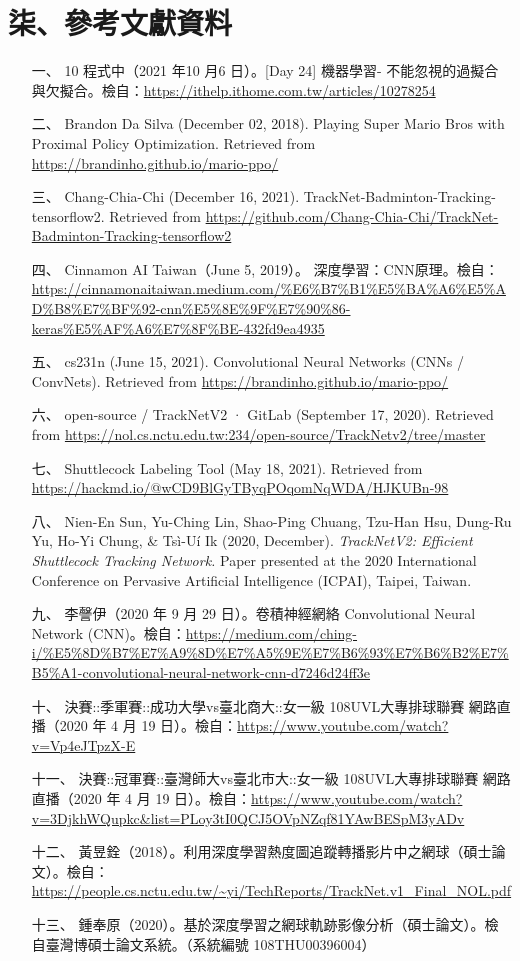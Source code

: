 \section{柒、參考文獻資料}
\begin{itemize}[itemindent = 2em]
    \item [一、] 10 程式中（2021 年10 月6 日）。[Day 24] 機器學習- 不能忽視的過擬合與欠擬合。檢自：\url{https://ithelp.ithome.com.tw/articles/10278254}
    \item [二、]Brandon Da Silva (December 02, 2018). Playing Super Mario Bros with Proximal Policy Optimization. Retrieved from \url{https://brandinho.github.io/mario-ppo/}
    \item [三、]Chang-Chia-Chi (December 16, 2021). TrackNet-Badminton-Tracking-tensorflow2. Retrieved from \url{https://github.com/Chang-Chia-Chi/TrackNet-Badminton-Tracking-tensorflow2}
    \item [四、]Cinnamon AI Taiwan（June 5, 2019）。 深度學習：CNN原理。檢自：\url{https://cinnamonaitaiwan.medium.com/%E6%B7%B1%E5%BA%A6%E5%AD%B8%E7%BF%92-cnn%E5%8E%9F%E7%90%86-keras%E5%AF%A6%E7%8F%BE-432fd9ea4935}
    \item [五、]cs231n (June 15, 2021). Convolutional Neural Networks (CNNs / ConvNets). Retrieved from \url{https://brandinho.github.io/mario-ppo/}
    \item [六、]open-source / TrackNetV2 · GitLab (September 17, 2020). Retrieved from \url{https://nol.cs.nctu.edu.tw:234/open-source/TrackNetv2/tree/master}
    \item [七、]Shuttlecock Labeling Tool (May 18, 2021). Retrieved from \url{https://hackmd.io/@wCD9BlGyTByqPOqomNqWDA/HJKUBn-98}
    \item [八、]Nien-En Sun, Yu-Ching Lin, Shao-Ping Chuang, Tzu-Han Hsu, Dung-Ru Yu, Ho-Yi Chung, \& Tsì-Uí Ik (2020, December). \textit{TrackNetV2: Efficient Shuttlecock Tracking Network.} Paper presented at the 2020 International Conference on Pervasive Artificial Intelligence (ICPAI), Taipei, Taiwan.
    \item [九、]李謦伊（2020 年 9 月 29 日）。卷積神經網絡 Convolutional Neural Network (CNN)。檢自：\url{https://medium.com/ching-i/%E5%8D%B7%E7%A9%8D%E7%A5%9E%E7%B6%93%E7%B6%B2%E7%B5%A1-convolutional-neural-network-cnn-d7246d24ff3e}
    \item [十、]決賽::季軍賽::成功大學vs臺北商大::女一級 108UVL大專排球聯賽 網路直播（2020 年 4 月 19 日）。檢自：\url{https://www.youtube.com/watch?v=Vp4eJTpzX-E}
    \item [十一、]決賽::冠軍賽::臺灣師大vs臺北市大::女一級 108UVL大專排球聯賽 網路直播（2020 年 4 月 19 日）。檢自：\url{https://www.youtube.com/watch?v=3DjkhWQupkc&list=PLoy3tI0QCJ5OVpNZqf81YAwBESpM3yADv}
    \item [十二、]黃昱銓（2018）。利用深度學習熱度圖追蹤轉播影片中之網球（碩士論文）。檢自：\url{https://people.cs.nctu.edu.tw/~yi/TechReports/TrackNet.v1_Final_NOL.pdf}
    \item [十三、]鍾奉原（2020）。基於深度學習之網球軌跡影像分析（碩士論文）。檢自臺灣博碩士論文系統。（系統編號 108THU00396004）
\end{itemize}